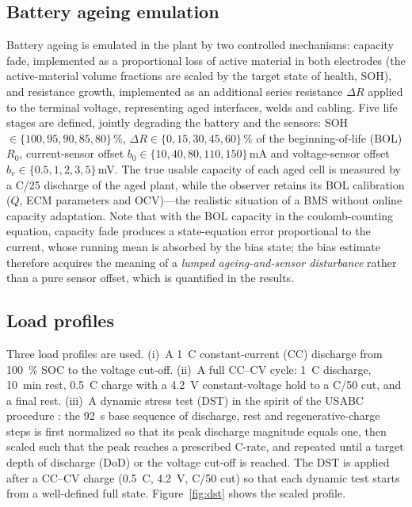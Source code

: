 \documentclass[11pt,a4paper]{article}
\begin{document}
\subsection{Battery ageing emulation}
\label{sec:aging}

Battery ageing is emulated in the plant by two controlled mechanisms:
capacity fade, implemented as a proportional loss of active material in
both electrodes (the active-material volume fractions are scaled by the
target state of health, SOH), and resistance growth, implemented as an
additional series resistance $\Delta R$ applied to the terminal voltage,
representing aged interfaces, welds and cabling. Five life stages are
defined, jointly degrading the battery and the sensors:
SOH $\in \{100, 95, 90, 85, 80\}\,\%$, $\Delta R \in
\{0, 15, 30, 45, 60\}\,\%$ of the beginning-of-life (BOL) $R_0$,
current-sensor offset $b_0 \in \{10, 40, 80, 110, 150\}$\,mA and
voltage-sensor offset $b_v \in \{0.5, 1, 2, 3, 5\}$\,mV. The true
usable capacity of each aged cell is measured by a C/25 discharge of the
aged plant, while the observer retains its BOL calibration ($Q$, ECM
parameters and OCV)---the realistic situation of a BMS without online
capacity adaptation. Note that with the BOL capacity in the
coulomb-counting equation, capacity fade produces a state-equation error
proportional to the current, whose running mean is absorbed by the bias
state; the bias estimate therefore acquires the meaning of a
\emph{lumped ageing-and-sensor disturbance} rather than a pure sensor
offset, which is quantified in the results.

\subsection{Load profiles}
\label{sec:profiles}

Three load profiles are used. (i)~A \SI{1}{C} constant-current (CC)
discharge from \SI{100}{\percent} SOC to the voltage cut-off. (ii)~A full
CC--CV cycle: \SI{1}{C} discharge, \SI{10}{min} rest, \SI{0.5}{C} charge
with a \SI{4.2}{V} constant-voltage hold to a C/50 cut, and a final rest.
(iii)~A dynamic stress test (DST) in the spirit of the USABC procedure
\citep{usabc1996}: the \SI{92}{s} base sequence of discharge, rest and
regenerative-charge steps is first normalized so that its peak discharge
magnitude equals one, then scaled such that the peak reaches a prescribed
C-rate, and repeated until a target depth of discharge (DoD) or the voltage
cut-off is reached. The DST is applied after a CC--CV charge
(\SI{0.5}{C}, \SI{4.2}{V}, C/50 cut) so that each dynamic test starts from
a well-defined full state. Figure~\ref{fig:dst} shows the scaled profile.
\end{document}
